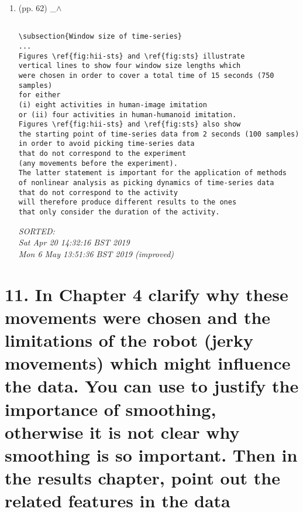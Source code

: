 \documentclass[12pt]{article}
\begin{document}
\begin{enumerate}

\item  (pp. 62)  \_$\wedge$  	


	\begin{verbatim}
	
\subsection{Window size of time-series}
...
Figures \ref{fig:hii-sts} and \ref{fig:sts} illustrate  
vertical lines to show four window size lengths which 
were chosen in order to cover a total time of 15 seconds (750 samples)
for either
(i) eight activities in human-image imitation 
or (ii) four activities in human-humanoid imitation.
Figures \ref{fig:hii-sts} and \ref{fig:sts} also show 
the starting point of time-series data from 2 seconds (100 samples) 
in order to avoid picking time-series data 
that do not correspond to the experiment 
(any movements before the experiment).
The latter statement is important for the application of methods
of nonlinear analysis as picking dynamics of time-series data 
that do not correspond to the activity
will therefore produce different results to the ones 
that only consider the duration of the activity. 

	\end{verbatim}
	\textit{
	SORTED: \\
	Sat Apr 20 14:32:16 BST 2019 \\
	Mon  6 May 13:51:36 BST 2019 (improved)
	}
	\\


\end{enumerate}



\section*{11. 
In Chapter 4 clarify why these movements were chosen
and the limitations of the robot (jerky movements)
which might influence the data. You can use to justify 
the importance of smoothing, otherwise it is not clear
why smoothing is so important. 
Then in the results chapter, 
point out the related features in the data
}
\end{document}

